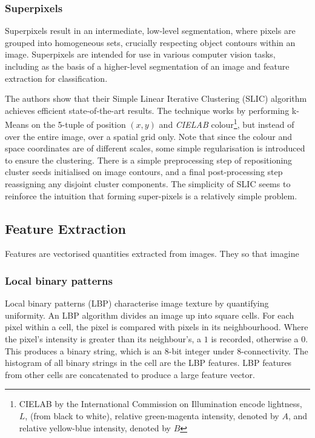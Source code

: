 \documentclass[11pt]{amsart}
\begin{document}
\subsubsection{Superpixels}

Superpixels result in an intermediate, low-level segmentation, where pixels are grouped into homogeneous sets, crucially respecting object contours within an image. Superpixels are intended for use in various computer vision tasks, including as the basis of a higher-level segmentation of an image and feature extraction for classification.

The authors show that their Simple Linear Iterative Clustering (SLIC) algorithm achieves efficient state-of-the-art results. The technique works by performing k-Means on the 5-tuple of position $(x, y)$ and \emph{CIELAB} colour\footnote{CIELAB by the International Commission on Illumination encode lightness, $L$, (from black to white), relative green-magenta intensity, denoted by $A$, and relative yellow-blue intensity, denoted by $B$}, but instead of over the entire image, over a spatial grid only. Note that since the colour and space coordinates are of different scales, some simple regularisation is introduced to ensure the clustering. There is a simple preprocessing step of repositioning cluster seeds initialised on image contours, and a final post-processing step reassigning any disjoint cluster components. The simplicity of SLIC seems to reinforce the intuition that forming super-pixels is a relatively simple problem.

\subsection{Feature Extraction}

Features are vectorised quantities extracted from images. They  so that imagine

\subsubsection{Local binary patterns}

Local binary patterns (LBP) characterise image texture by quantifying uniformity. An LBP algorithm divides an image up into square cells. For each pixel within a cell, the pixel is compared with pixels in its neighbourhood. Where the pixel's intensity is greater than its neighbour's, a $1$ is recorded, otherwise a $0$. This produces a binary string, which is an 8-bit integer under 8-connectivity. The histogram of all binary strings in the cell are the LBP features. LBP features from other cells are concatenated to produce a large feature vector.
\end{document}
